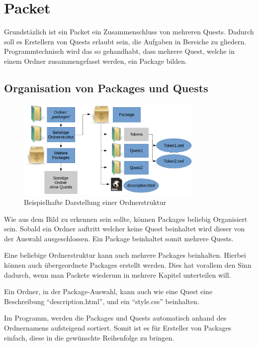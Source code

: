 \section{Packet}
Grundstäzlich ist ein Packet ein Zusammenschluss von mehreren Quests. Dadurch soll es Erstellern von Quests erlaubt sein, die Aufgaben in Bereiche zu gliedern. Programmtechnisch wird das so gehandhabt, dass mehrere Quest, welche in einem Ordner zusammengefasst werden, ein Package bilden.

\subsection{Organisation von Packages und Quests}
\begin{figure}[h] 
  \centering
     \includegraphics[width=0.8\textwidth]{./media/images/quest/ordnerstruktur.png}
  \caption{Beispielhafte Darstellung einer Ordnerstruktur}
  \label{fig:package_ordnerstruktur_1}
\end{figure}
Wie aus dem Bild zu erkennen sein sollte, können Packages beliebig Organisiert sein. Sobald ein Ordner auftritt welcher keine Quest beinhaltet wird dieser von der Auswahl ausgeschlossen. 
Ein Package beinhaltet somit mehrere Quests.

Eine beliebige Ordnerstruktur kann auch mehrere Packages beinhalten. Hierbei können auch übergeordnete Packages erstellt werden. Dies hat vorallem den Sinn dadurch, wenn man Packete wiederum in mehrere Kapitel unterteilen will.

Ein Ordner, in der Package-Auswahl, kann auch wie eine Quest eine Beschreibung “description.html”, und ein “style.css” beinhalten.

Im Programm, werden die Packages und Quests automatisch anhand des Ordnernamens aufsteigend sortiert. Somit ist es für Ersteller von Packages einfach, diese in die gewünschte Reihenfolge zu bringen.